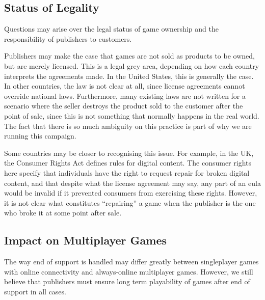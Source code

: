 \subsection{Status of Legality}
Questions may arise over the legal status of game ownership and the responsibility of publishers to customers.

Publishers may make the case that games are not sold as products to be owned, but are merely licensed.
This is a legal grey area, depending on how each country interprets the agreements made.
In the United States, this is generally the case\cn.
In other countries, the law is not clear at all, since license agreements cannot override national laws.
Furthermore, many existing laws are not written for a scenario where the seller destroys the product sold to the customer after the point of sale,
since this is not something that normally happens in the real world.
The fact that there is so much ambiguity on this practice is part of why we are running this campaign.

Some countries may be closer to recognising this issue.
For example, in the UK, the Consumer Rights Act defines rules for digital content\cite{cra-digital-2015}.
The consumer rights here specify that individuals have the right to request repair for broken digital content,
and that despite what the license agreement may say, any part of an \gls{eula} would be invalid if it prevented consumers from exercising these rights.
However, it is not clear what constitutes ``repairing'' a game when the publisher is the one who broke it at some point after sale.



\subsection{Impact on Multiplayer Games}
The way end of support is handled may differ greatly between singleplayer games with online connectivity and always-online multiplayer games.
However, we still believe that publishers must ensure long term playability of games after end of support in all cases.

